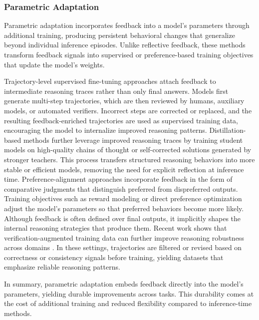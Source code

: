 \subsubsection{Parametric Adaptation}

Parametric adaptation incorporates feedback into a model’s parameters through additional training, producing persistent behavioral changes that generalize beyond individual inference episodes. Unlike reflective feedback, these methods transform feedback signals into supervised or preference-based training objectives that update the model’s weights.

Trajectory-level supervised fine-tuning approaches \cite{zeng2024agenttuning,aksitov2023rest} attach feedback to intermediate reasoning traces rather than only final answers. Models first generate multi-step trajectories, which are then reviewed by humans, auxiliary models, or automated verifiers. Incorrect steps are corrected or replaced, and the resulting feedback-enriched trajectories are used as supervised training data, encouraging the model to internalize improved reasoning patterns. Distillation-based methods \cite{hsieh2023distilling} further leverage improved reasoning traces by training student models on high-quality chains of thought or self-corrected solutions generated by stronger teachers. This process transfers structured reasoning behaviors into more stable or efficient models, removing the need for explicit reflection at inference time. Preference-alignment approaches \cite{christiano2017deep,rafailov2023dpo,bai2022constitutional} incorporate feedback in the form of comparative judgments that distinguish preferred from dispreferred outputs. Training objectives such as reward modeling or direct preference optimization adjust the model’s parameters so that preferred behaviors become more likely. Although feedback is often defined over final outputs, it implicitly shapes the internal reasoning strategies that produce them. Recent work shows that verification-augmented training data can further improve reasoning robustness across domains \cite{li2025reflectevo,zheng2025reasoningcv}. In these settings, trajectories are filtered or revised based on correctness or consistency signals before training, yielding datasets that emphasize reliable reasoning patterns.

In summary, parametric adaptation embeds feedback directly into the model’s parameters, yielding durable improvements across tasks. This durability comes at the cost of additional training and reduced flexibility compared to inference-time methods.


